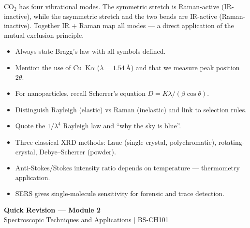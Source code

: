 \documentclass[12pt,a4paper]{article}
\begin{document}
\begin{tcolorbox}[masonbox, title={IR vs Raman: Complementary Spectra of \texorpdfstring{$\mathrm{CO_2}$}{CO2}}]
$\mathrm{CO_2}$ has four vibrational modes. The symmetric stretch is Raman-active (IR-inactive), while the asymmetric stretch and the two bends are IR-active (Raman-inactive). Together IR + Raman map all modes — a direct application of the mutual exclusion principle.
\end{tcolorbox}

\begin{tcolorbox}[exambox, title={Exam Points (Section 7)}]
\begin{itemize}[leftmargin=*, itemsep=2pt, topsep=2pt]
  \item Always state Bragg's law with all symbols defined.
  \item Mention the use of Cu~K$\alpha$ ($\lambda=1.54\,\text{\AA}$) and that we measure peak position $2\theta$.
  \item For nanoparticles, recall Scherrer's equation $D=K\lambda/(\beta\cos\theta)$.
  \item Distinguish Rayleigh (elastic) vs Raman (inelastic) and link to selection rules.
  \item Quote the $1/\lambda^{4}$ Rayleigh law and ``why the sky is blue''.
  \item Three classical XRD methods: Laue (single crystal, polychromatic), rotating-crystal, Debye--Scherrer (powder).
  \item Anti-Stokes/Stokes intensity ratio depends on temperature --- thermometry application.
  \item SERS gives single-molecule sensitivity for forensic and trace detection.
\end{itemize}
\end{tcolorbox}

\newpage
\begin{center}
  {\large\bfseries\color{myred} Quick Revision --- Module 2}\\[3pt]
  {\small\color{mydark} Spectroscopic Techniques and Applications $|$ BS-CH101}
\end{center}
\noindent{\color{myred}\rule{\linewidth}{1.2pt}}
\vspace{4pt}
\end{document}
